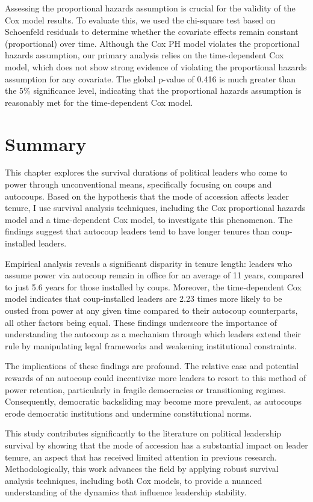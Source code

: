 \documentclass[
  12pt,
]{report}
\begin{document}
Assessing the proportional hazards assumption is crucial for the
validity of the Cox model results. To evaluate this, we used the
chi-square test based on Schoenfeld residuals to determine whether the
covariate effects remain constant (proportional) over time. Although the
Cox PH model violates the proportional hazards assumption, our primary
analysis relies on the time-dependent Cox model, which does not show
strong evidence of violating the proportional hazards assumption for any
covariate. The global p-value of 0.416 is much greater than the 5\%
significance level, indicating that the proportional hazards assumption
is reasonably met for the time-dependent Cox model.

\section{Summary}\label{summary-2}

This chapter explores the survival durations of political leaders who
come to power through unconventional means, specifically focusing on
coups and autocoups. Based on the hypothesis that the mode of accession
affects leader tenure, I use survival analysis techniques, including the
Cox proportional hazards model and a time-dependent Cox model, to
investigate this phenomenon. The findings suggest that autocoup leaders
tend to have longer tenures than coup-installed leaders.

Empirical analysis reveals a significant disparity in tenure length:
leaders who assume power via autocoup remain in office for an average of
11 years, compared to just 5.6 years for those installed by coups.
Moreover, the time-dependent Cox model indicates that coup-installed
leaders are 2.23 times more likely to be ousted from power at any given
time compared to their autocoup counterparts, all other factors being
equal. These findings underscore the importance of understanding the
autocoup as a mechanism through which leaders extend their rule by
manipulating legal frameworks and weakening institutional constraints.

The implications of these findings are profound. The relative ease and
potential rewards of an autocoup could incentivize more leaders to
resort to this method of power retention, particularly in fragile
democracies or transitioning regimes. Consequently, democratic
backsliding may become more prevalent, as autocoups erode democratic
institutions and undermine constitutional norms.

This study contributes significantly to the literature on political
leadership survival by showing that the mode of accession has a
substantial impact on leader tenure, an aspect that has received limited
attention in previous research. Methodologically, this work advances the
field by applying robust survival analysis techniques, including both
Cox models, to provide a nuanced understanding of the dynamics that
influence leadership stability.
\end{document}
